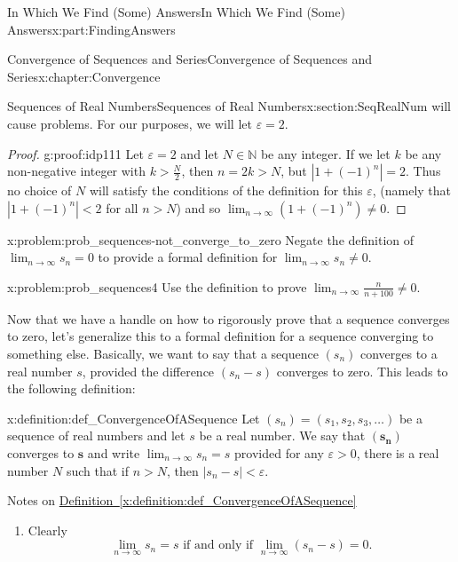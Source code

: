 \documentclass[oneside,10pt,]{book}
\newcommand{\xreffont}{\relax}
\numberwithin{equation}{section}
\newcommand{\eps}{\varepsilon}
\newcommand{\NN}{\mathbb {N}}
\newcommand{\lt}{<}
\begin{document}
\begin{partptx}{In Which We Find (Some) Answers}{}{In Which We Find (Some) Answers}{}{}{x:part:FindingAnswers}
\begin{chapterptx}{Convergence of Sequences and Series}{}{Convergence of Sequences and Series}{}{}{x:chapter:Convergence}
\begin{sectionptx}{Sequences of Real Numbers}{}{Sequences of Real Numbers}{}{}{x:section:SeqRealNum}
\eps{}\) will cause problems.  For our purposes, we will let \(\eps=2\).%
\begin{proof}{}{g:proof:idp111}
Let \(\eps=2\) and let \(N\in\NN\) be any integer. If we let \(k\) be any non-negative integer with \(k>\frac{N}{2}\), then \(n=2k>N\), but \(|1+(-1)^n|=2\). Thus no choice of \(N\) will satisfy the conditions of the definition for this \(\eps\), (namely that \(|1+(-1)^n|\lt 2\) for all \(n>N\)) and so \(\lim_{n\rightarrow\infty}\left(1+(-1)^n\right)\neq 0\).%
\end{proof}
\begin{problem}{}{x:problem:prob_sequences-not_converge_to_zero}%
 Negate the definition of \(\lim_{n\rightarrow\infty}s_n=0\) to provide a formal definition for \(\lim_{n\rightarrow\infty}s_n\neq 0\).%
\end{problem}
\begin{problem}{}{x:problem:prob_sequences4}%
Use the definition to prove \(\lim_{n\rightarrow\infty}\frac{n}{n+100}\neq 0\).%
\end{problem}
Now that we have a handle on how to rigorously prove that a sequence converges to zero, let's generalize this to a formal definition for a sequence converging to something else. Basically, we want to say that a sequence \(\left(s_n\right)\) converges to a real number \(s\), provided the difference \(\left(s_n-s\right)\) converges to zero. This leads to the following definition:%
\begin{definition}{}{x:definition:def_ConvergenceOfASequence}%
 Let \(\left(s_n\right)=\left(s_1,s_2,s_3,\ldots\right)\) be a sequence of real numbers and let \(s\) be a real number. We say that \(\left(\boldsymbol{s}_{\boldsymbol{n}}\right)\) \textbraceleft{}converges to\textbraceright{} \(\boldsymbol{s}\) and write \(\lim_{n\rightarrow\infty}s_n=s\) provided for any \(\eps>0\), there is a real number \(N\) such that if \(n>N\), then \(|s_n-s|\lt \eps\).%
\end{definition}
\textbraceleft{}Notes on \hyperref[x:definition:def_ConvergenceOfASequence]{Definition~{\xreffont\ref{x:definition:def_ConvergenceOfASequence}}}\textbraceright{}%
\par
%
\begin{enumerate}
\item{}Clearly%
\begin{equation*}
\lim_{n\rightarrow\infty}s_n=s \text{ if and only if } \lim_{n\rightarrow\infty}\left(s_n-s\right)=0\text{.}

\end{equation*}
\end{enumerate}
\end{sectionptx}
\end{chapterptx}
\end{partptx}
\end{document}
